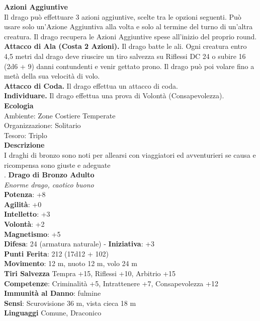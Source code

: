 \begin{multicols}{2}
\textbf{Azioni Aggiuntive}\\
Il drago può effettuare 3 azioni aggiuntive, scelte tra le opzioni seguenti. Può usare solo un'Azione Aggiuntiva alla volta e solo al termine del turno di un'altra creatura. Il drago recupera le Azioni Aggiuntive spese all'inizio del proprio round.\\
\textbf{Attacco di Ala (Costa 2 Azioni).} Il drago batte le ali. Ogni creatura entro 4,5 metri dal drago deve riuscire un tiro salvezza su Riflessi DC 24 o subire 16 (2d6 + 9) danni contundenti e venir gettato prono. Il drago può poi volare fino a metà della sua velocità di volo.\\
\textbf{Attacco di Coda.} Il drago effettua un attacco di coda.\\
\textbf{Individuare.} Il drago effettua una prova di Volontà (Consapevolezza).\\
\textbf{Ecologia}\\
Ambiente: Zone Costiere Temperate\\
Organizzazione: Solitario\\
Tesoro: Triplo\\
\textbf{Descrizione}\\
I draghi di bronzo sono noti per allearsi con viaggiatori ed avventurieri se causa e ricompensa sono giuste e adeguate\\
.
\medskip\textbf{Drago di Bronzo Adulto}\\
\emph{Enorme drago, caotico buono}\\
\textbf{Potenza}: +8\\
\textbf{Agilità}: +0\\
\textbf{Intelletto}: +3\\
\textbf{Volontà}: +2\\
\textbf{Magnetismo}: +5\\
\textbf{Difesa}: 24 (armatura naturale) - \textbf{Iniziativa}: +3\\
\textbf{Punti Ferita}: 212 (17d12 + 102)\\
\textbf{Movimento}: 12 m, nuoto 12 m, volo 24 m\\
\textbf{Tiri Salvezza} Tempra +15, Riflessi +10, Arbitrio +15\\
\textbf{Competenze}: Criminalità +5, Intrattenere +7, Consapevolezza +12\\
\textbf{Immunità al Danno}: fulmine\\
\textbf{Sensi}: Scurovisione 36 m, vista cieca 18 m\\
\textbf{Linguaggi} Comune, Draconico\\

\end{multicols}
